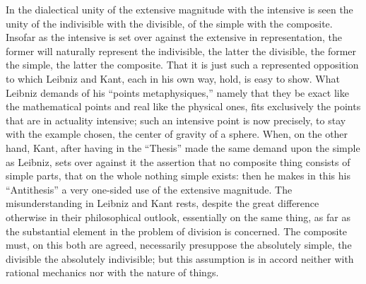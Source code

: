 \documentclass[12pt,a4paper,openany]{book}
\newcommand{\opage}[1]{\marginnote{\footnotesize\textit{[#1]}}}
\begin{document}
In the dialectical unity of the extensive magnitude with the intensive is seen the unity of the indivisible with the divisible, of the simple with the composite. Insofar as the intensive is set over against the extensive in representation, the former will
\setcounter{footnote}{0}%
\opage{130}naturally represent the indivisible, the latter the divisible, the former the simple, the latter the composite. That it is just such a represented opposition to which Leibniz and Kant, each in his own way, hold, is easy to show. What Leibniz demands of his ``points metaphysiques,'' namely that they be exact like the mathematical points and real like the physical ones, fits exclusively the points that are in actuality intensive; such an intensive point is now precisely, to stay with the example chosen, the center of gravity of a sphere. When, on the other hand, Kant, after having in the ``Thesis'' made the same demand upon the simple as Leibniz, sets over against it the assertion that no composite thing consists of simple parts, that on the whole nothing simple exists: then he makes in this his ``Antithesis'' a very one-sided use of the extensive magnitude. The misunderstanding in Leibniz and Kant rests, despite the great difference otherwise in their philosophical outlook, essentially on the same thing, as far as the substantial element in the problem of division is concerned. The composite must, on this both are agreed, necessarily presuppose the absolutely simple, the divisible the absolutely indivisible; but this assumption is in accord neither with rational mechanics nor with the nature of things.
\end{document}
